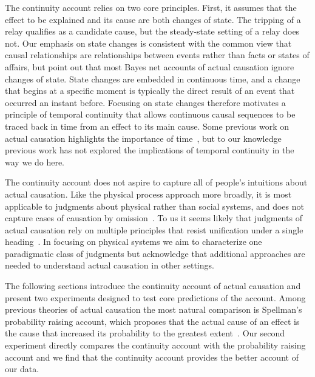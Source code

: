 \documentclass[10pt,letterpaper]{article}
\begin{document}
The continuity account relies on two core principles. First, it assumes that the effect to be explained and its cause are both changes of state. The tripping of a relay qualifies as a candidate cause, but the steady-state setting of a relay does not. Our emphasis on state changes is consistent with the common view that causal relationships are relationships between events rather than facts or states of affairs, but   point out that most Bayes net accounts of actual causation ignore changes of state. State changes are embedded in continuous time, and a change that begins at a specific moment is typically the direct result of an event that occurred an instant before. Focusing on state changes therefore motivates a principle of temporal continuity that allows continuous causal sequences to be traced back in time from an effect to its main cause. Some previous work on actual causation highlights the importance of time~\cite{youngs09,stephanmw20e}, but to our knowledge previous work has not explored the implications of temporal continuity in the way we do here.

The continuity account does not aspire to capture all of people's intuitions about actual causation. Like the physical process approach more broadly, it is most applicable to judgments about physical rather than social systems, and does not capture cases of causation by omission~\cite{wolffbh10}. To us it seems likely that judgments of actual causation rely on multiple principles that resist unification under a single heading~\cite{hall04,danks17}. In focusing on physical systems we aim to characterize one paradigmatic class of judgments but acknowledge that additional approaches are needed to understand actual causation in other settings.

The following sections introduce the continuity account of actual causation and present two experiments designed to test core predictions of the account. Among previous theories of actual causation the most natural comparison is Spellman's probability raising account, which proposes that the actual cause of an effect is the cause that increased its probability to the greatest extent~\cite{spellman97}. Our second experiment directly compares the continuity account with the probability raising account and we find that the continuity account provides the better account of our data.
\end{document}

